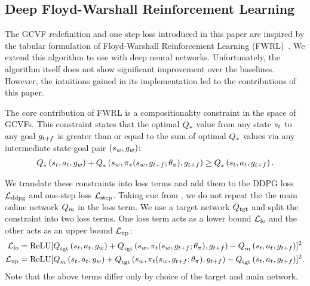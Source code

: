 \subsection{Deep Floyd-Warshall Reinforcement Learning}

The GCVF redefinition and one step-loss introduced in this paper are inspired by
the tabular formulation of Floyd-Warshall
Reinforcement Learning (FWRL)~\citep{dhiman2018floydwarshall}.
We extend this algorithm to use with deep neural networks.
Unfortunately, the algorithm itself does not show significant improvement over
the baselines. However, the intuitions gained in its implementation led to
the contributions of this paper. 

The core contribution of FWRL is a compositionality constraint in the space
of GCVFs. 
This constraint states that the optimal $\Q_*$ value 
from any state $\state_t$ to any goal $\goal_{t+f}$ is greater than or equal to
the sum of optimal $\Q_*$ values via any intermediate state-goal pair $(\state_{w}, \goal_{w})$:
%
\begin{align}
      \fwargs{\state_{t}}{\act_t}{\goal_{w}}{*}{}
      + \fwargs{\state_{w}}{\policy_*(\state_{w}, \goal_{t+f};\param_\policy)}{\goal_{t+f}}{*}{}
      \ge \fwargs{\state_{t}}{\act_t}{\goal_{t+f}}{*}{}.
\end{align}%
% 

We translate these constraints into loss terms and add them to the
DDPG loss $\LossDDPG$ and one-step loss $\LossStep$.
Taking cue from \citet{mnih2015human}, we do
not repeat the the main online network $\Q_{m}$ in the loss term. We use
a target network $\Qtgt$ and split the constraint into two loss terms. One loss term acts
as a lower bound $\LossLo$ and the other acts as an upper bound $\LossUp$:
%
\begin{align}
  \LossLo &= \text{ReLU}[
      \fwargs{\state_{t}}{\act_t}{\goal_{w}}{\tgt}{}
      + \fwargs{\state_{w}}{\policy_t(\state_{w}, \goal_{t+f};\param_\policy)}{\goal_{t+f}}{\tgt}{}
      - \fwargs{\state_{t}}{\act_t}{\goal_{t+f}}{m}{}
      ]^2
                         \\
  \LossUp &= \text{ReLU}[
      \fwargs{\state_{t}}{\act_t}{\goal_{w}}{m}{}
      + \fwargs{\state_{w}}{\policy_t(\state_{w}, \goal_{t+f};\param_\policy)}{\goal_{t+f}}{\tgt}{}
      - \fwargs{\state_{t}}{\act_t}{\goal_{t+f}}{\tgt}{}
      ]^2.
\end{align}%
% 
Note that the above terms differ only by choice of the target and main network. 

